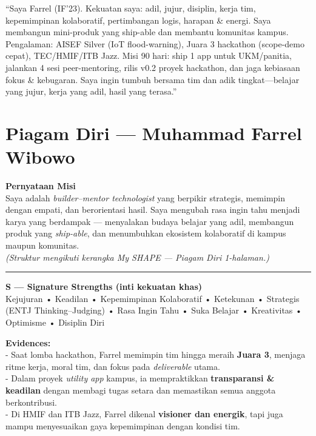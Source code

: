 \documentclass[
  letterpaper,
  DIV=11,
  numbers=noendperiod]{scrreprt}
\begin{document}
``Saya Farrel (IF'23). Kekuatan saya: adil, jujur, disiplin, kerja tim,
kepemimpinan kolaboratif, pertimbangan logis, harapan \& energi. Saya
membangun mini-produk yang ship-able dan membantu komunitas kampus.
Pengalaman: AISEF Silver (IoT flood-warning), Juara 3 hackathon
(scope-demo cepat), TEC/HMIF/ITB Jazz. Misi 90 hari: ship 1 app untuk
UKM/panitia, jalankan 4 sesi peer-mentoring, rilis v0.2 proyek
hackathon, dan jaga kebiasaan fokus \& kebugaran. Saya ingin tumbuh
bersama tim dan adik tingkat---belajar yang jujur, kerja yang adil,
hasil yang terasa.''


\chapter{Piagam Diri --- Muhammad Farrel
Wibowo}\label{piagam-diri-muhammad-farrel-wibowo}

\textbf{Pernyataan Misi}\\
Saya adalah \emph{builder--mentor technologist} yang berpikir strategis,
memimpin dengan empati, dan berorientasi hasil. Saya mengubah rasa ingin
tahu menjadi karya yang berdampak --- menyalakan budaya belajar yang
adil, membangun produk yang \emph{ship-able}, dan menumbuhkan ekosistem
kolaboratif di kampus maupun komunitas.\\
\emph{(Struktur mengikuti kerangka My SHAPE --- Piagam Diri 1-halaman.)}

\begin{center}\rule{0.5\linewidth}{0.5pt}\end{center}

\textbf{S --- Signature Strengths (inti kekuatan khas)}\\
Kejujuran • Keadilan • Kepemimpinan Kolaboratif • Ketekunan • Strategis
(ENTJ Thinking--Judging) • Rasa Ingin Tahu • Suka Belajar • Kreativitas
• Optimisme • Disiplin Diri

\textbf{Evidences:}\\
- Saat lomba hackathon, Farrel memimpin tim hingga meraih \textbf{Juara
3}, menjaga ritme kerja, moral tim, dan fokus pada \emph{deliverable}
utama.\\
- Dalam proyek \emph{utility app} kampus, ia mempraktikkan
\textbf{transparansi \& keadilan} dengan membagi tugas setara dan
memastikan semua anggota berkontribusi.\\
- Di HMIF dan ITB Jazz, Farrel dikenal \textbf{visioner dan energik},
tapi juga mampu menyesuaikan gaya kepemimpinan dengan kondisi tim.
\end{document}
